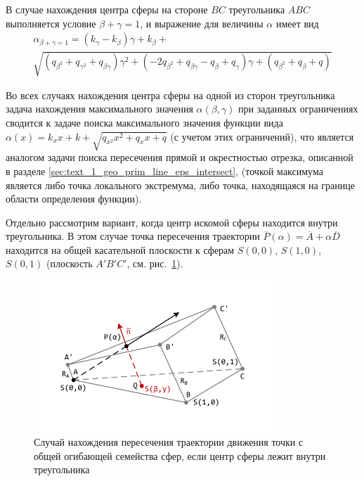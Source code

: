 В случае нахождения центра сферы на стороне $BC$ треугольника $ABC$ выполняется условие $\beta + \gamma = 1$, и выражение для величины $\alpha$ имеет вид
\begin{multline}
	\alpha_{\beta + \gamma = 1} = (k_{\gamma} - k_{\beta}) \gamma + k_{\beta} + \\
	\sqrt{(q_{\beta^2} + q_{\gamma^2} + q_{\beta \gamma}) \gamma^2 + (-2 q_{\beta^2} + q_{\beta \gamma} - q_{\beta} + q_{\gamma}) \gamma + (q_{\beta^2} + q_{\beta} + q)}
\end{multline}

Во всех случаях нахождения центра сферы на одной из сторон треугольника задача нахождения максимального значения $\alpha(\beta, \gamma)$ при заданных ограничениях сводится к задаче поиска максимального значения функции вида $\alpha(x) = k_x x + k + \sqrt{q_{x^2} x^2 + q_x x + q}$ (с учетом этих ограничений), что является аналогом задачи поиска пересечения прямой и окрестностью отрезка, описанной в разделе \ref{sec:text_1_geo_prim_line_eps_intersect}, (точкой максимума является либо точка локального экстремума, либо точка, находящаяся на границе области определения функции).

Отдельно рассмотрим вариант, когда центр искомой сферы находится внутри треугольника.
В этом случае точка пересечения траектории $\overline{P}(\alpha) = \overline{A} + \alpha \overline{D}$ находится на общей касательной плоскости к сферам $S(0,0)$, $S(1,0)$, $S(0,1)$ (плоскость $A'B'C'$, см. рис.~\ref{fig:text_1_remesh_common_envelope_3}).

\begin{figure}[ht]
	\centering
		\includegraphics[width=0.80\textwidth]{./pics/text_1_remesh_common_envelope/case1.pdf}
	\caption{Случай нахождения пересечения траектории движения точки с общей огибающей семейства сфер, если центр сферы лежит внутри треугольника}
	\label{fig:text_1_remesh_common_envelope_3}
\end{figure}

